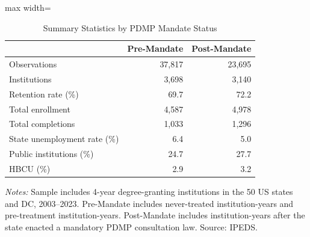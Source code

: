 \begin{table}[htbp]
\centering
\caption{Summary Statistics by PDMP Mandate Status}
\label{tab:summary}
\begin{adjustbox}{max width=\textwidth}
\begin{tabular}{lrr}
\toprule
 & Pre-Mandate & Post-Mandate \\
\midrule
Observations & 37,817 & 23,695 \\
Institutions & 3,698 & 3,140 \\
Retention rate (\%) & 69.7 & 72.2 \\
Total enrollment & 4,587 & 4,978 \\
Total completions & 1,033 & 1,296 \\
State unemployment rate (\%) & 6.4 & 5.0 \\
Public institutions (\%) & 24.7 & 27.7 \\
HBCU (\%) & 2.9 & 3.2 \\
\bottomrule
\end{tabular}
\end{adjustbox}
\begin{tablenotes}
\small
\item \textit{Notes:} Sample includes 4-year degree-granting institutions in the 50 US states and DC, 2003--2023. Pre-Mandate includes never-treated institution-years and pre-treatment institution-years. Post-Mandate includes institution-years after the state enacted a mandatory PDMP consultation law. Source: IPEDS.
\end{tablenotes}
\end{table}
